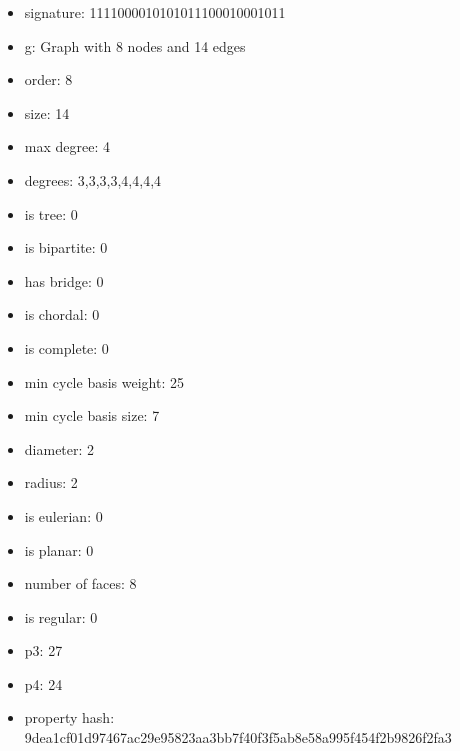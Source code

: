 \begin{itemize}
\item signature: 1111000010101011100010001011
\item g: Graph with 8 nodes and 14 edges
\item order: 8
\item size: 14
\item max degree: 4
\item degrees: 3,3,3,3,4,4,4,4
\item is tree: 0
\item is bipartite: 0
\item has bridge: 0
\item is chordal: 0
\item is complete: 0
\item min cycle basis weight: 25
\item min cycle basis size: 7
\item diameter: 2
\item radius: 2
\item is eulerian: 0
\item is planar: 0
\item number of faces: 8
\item is regular: 0
\item p3: 27
\item p4: 24
\item property hash: 9dea1cf01d97467ac29e95823aa3bb7f40f3f5ab8e58a995f454f2b9826f2fa3
\end{itemize}
\newpage
\begin{figure}
\end{figure}
